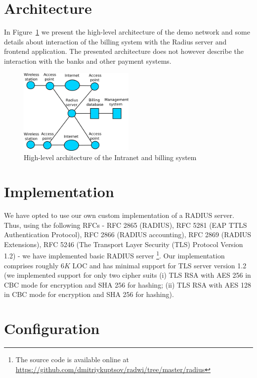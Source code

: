 \section{Architecture}
\label{section:architecture}

In Figure~\ref{fig:arch} we present the high-level architecture of the demo network 
and some details about interaction of the billing system with the Radius server
and frontend application. The presented architecture does not however describe
the interaction with the banks and other payment systems. 

\begin{figure}[!h]
	\includegraphics[width=0.5\textwidth]{graphics/arch.png}
	\caption{High-level architecture of the Intranet and billing system}
	\label{fig:arch}
\end{figure}

\section{Implementation}

We have opted to use our own custom implementation of a RADIUS server. 
Thus, using the following RFCs - RFC 2865 (RADIUS), RFC 5281 (EAP TTLS Authentication Protocol), 
RFC 2866 (RADIUS accounting), RFC 2869 (RADIUS Extensions), RFC 5246 (The Transport Layer 
Security (TLS) Protocol Version 1.2) - we have implemented basic RADIUS server
\footnote{The source code is available online at 
\url{https://github.com/dmitriykuptsov/radwi/tree/master/radius}}. Our implementation
comprises roughly $6K$ LOC and has minimal support for TLS server version 1.2 (we implemented 
support for only two cipher suits (i) TLS RSA with AES 256 in CBC mode for encryption and SHA 256 for 
hashing; (ii) TLS RSA with AES 128 in CBC mode for encryption and SHA 256 for 
hashing). 

\section{Configuration}

